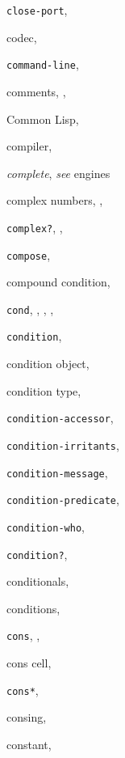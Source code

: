 {\begin{multicols}{2}
\texttt{close-port}, \textit{\pageref{io_s46}}
  
codec, \pageref{io_s10}
  
\texttt{command-line}, \textit{\pageref{libraries_s17}}
  
comments, \pageref{intro_s42}, \pageref{grammar_s5}
  
Common Lisp, \pageref{intro_s28}
  
compiler, \pageref{intro_s9}
  
\textit{complete}, \textit{see} engines
  
complex numbers, \pageref{objects_s67}, \pageref{examples_s69}
  
\texttt{complex?}, \textit{\pageref{objects_s17}}, \pageref{objects_s71}
  
\texttt{compose}, \pageref{start_s95}
  
compound condition, \pageref{exceptions_s11}
  
\texttt{cond}, \pageref{start_s124}, \pageref{start_s142}, \textit{\pageref{control_s13}}, \pageref{syntax_s39}
  
\texttt{condition}, \textit{\pageref{exceptions_s15}}
  
condition object, \pageref{exceptions_s9}
  
condition type, \pageref{exceptions_s10}
  
\texttt{condition-accessor}, \textit{\pageref{exceptions_s18}}
  
\texttt{condition-irritants}, \textit{\pageref{exceptions_s25}}
  
\texttt{condition-message}, \textit{\pageref{exceptions_s24}}
  
\texttt{condition-predicate}, \textit{\pageref{exceptions_s18}}
  
\texttt{condition-who}, \textit{\pageref{exceptions_s26}}
  
\texttt{condition?}, \textit{\pageref{exceptions_s14}}
  
conditionals, \pageref{control_s9}
  
conditions, \pageref{exceptions_s1}
  
\texttt{cons}, \pageref{start_s25}, \textit{\pageref{objects_s37}}
  
cons cell, \pageref{objects_s27}
  
\texttt{cons*}, \textit{\pageref{objects_s44}}
  
consing, \pageref{start_s26}
  
constant, \textit{\pageref{objects_s1}}
  

\end{multicols}}
